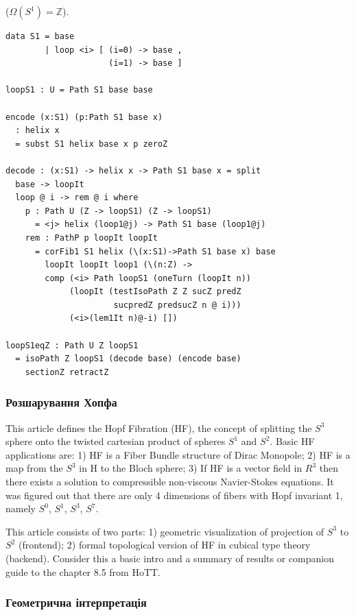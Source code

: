\begin{definition}
\begin{theorem} ($\Omega(S^1)=\mathbb{Z}$).
\begin{lstlisting}
data S1 = base
        | loop <i> [ (i=0) -> base ,
                     (i=1) -> base ]

loopS1 : U = Path S1 base base

encode (x:S1) (p:Path S1 base x)
  : helix x
  = subst S1 helix base x p zeroZ

decode : (x:S1) -> helix x -> Path S1 base x = split
  base -> loopIt
  loop @ i -> rem @ i where
    p : Path U (Z -> loopS1) (Z -> loopS1)
      = <j> helix (loop1@j) -> Path S1 base (loop1@j)
    rem : PathP p loopIt loopIt
      = corFib1 S1 helix (\(x:S1)->Path S1 base x) base
        loopIt loopIt loop1 (\(n:Z) ->
        comp (<i> Path loopS1 (oneTurn (loopIt n))
             (loopIt (testIsoPath Z Z sucZ predZ
                      sucpredZ predsucZ n @ i)))
             (<i>(lem1It n)@-i) [])

loopS1eqZ : Path U Z loopS1
  = isoPath Z loopS1 (decode base) (encode base)
    sectionZ retractZ
\end{lstlisting}
\end{theorem}

\subsubsection{Розшарування Хопфа}

This article defines the Hopf Fibration (HF), the concept
of splitting the $S^3$ sphere onto the twisted cartesian product
of spheres $S^1$ and $S^2$.
Basic HF applications are:
1) HF is a Fiber Bundle structure of Dirac Monopole;
2) HF is a map from the $S^3$ in H to the Bloch sphere;
3) If HF is a vector field in $R^3$ then there exists a solution
to compressible non-viscous Navier-Stokes equations.
It was figured out that there are only
4 dimensions of fibers with Hopf invariant 1, namely
$S^0$, $S^1$, $S^3$, $S^7$.

This article consists of two parts:
1) geometric visualization of projection of $S^3$ to $S^2$ (frontend);
2) formal topological version of HF in cubical type theory (backend).
Consider this a basic intro and a summary of results or companion
guide to the chapter 8.5 from HoTT.

\subsubsection*{Геометрична інтерпретація}


\end{definition}
